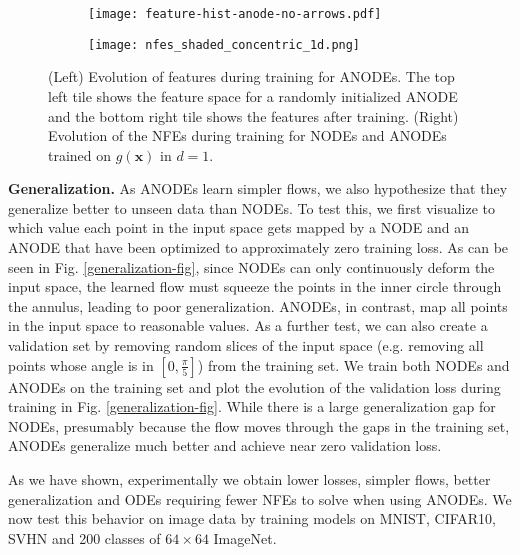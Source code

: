 \documentclass{article}
\begin{document}
\begin{figure}[t]
\centering
\begin{subfigure}[t]{0.47\linewidth}
\centering
\texttt{[image: feature-hist-anode-no-arrows.pdf]}
\end{subfigure} \hspace{0.05\linewidth}
\begin{subfigure}[t]{0.40\linewidth}
\centering
\texttt{[image: nfes\_shaded\_concentric\_1d.png]}
\end{subfigure}
\setlength{\belowcaptionskip}{-10pt}
\caption{(Left) Evolution of features during training for ANODEs. The top left tile shows the feature space for a randomly initialized ANODE and the bottom right tile shows the features after training. (Right) Evolution of the NFEs during training for NODEs and ANODEs trained on $g(\mathbf{x})$ in $d=1$.}
\label{nfes-anode-vs-node}
\end{figure}

\textbf{Generalization.} As ANODEs learn simpler flows, we also hypothesize that they generalize better to unseen data than NODEs. To test this, we first visualize to which value each point in the input space gets mapped by a NODE and an ANODE that have been optimized to approximately zero training loss. As can be seen in Fig. \ref{generalization-fig}, since NODEs can only continuously deform the input space, the learned flow must squeeze the points in the inner circle through the annulus, leading to poor generalization. ANODEs, in contrast, map all points in the input space to reasonable values. As a further test, we can also create a validation set by removing random slices of the input space (e.g. removing all points whose angle is in $[0, \frac{\pi}{5}]$) from the training set. We train both NODEs and ANODEs on the training set and plot the evolution of the validation loss during training in Fig. \ref{generalization-fig}. While there is a large generalization gap for NODEs, presumably because the flow moves through the gaps in the training set, ANODEs generalize much better and achieve near zero validation loss.

As we have shown, experimentally we obtain lower losses, simpler flows, better generalization and ODEs requiring fewer NFEs to solve when using ANODEs. We now test this behavior on image data by training models on MNIST, CIFAR10, SVHN and 200 classes of $64\times64$ ImageNet.
\end{document}
